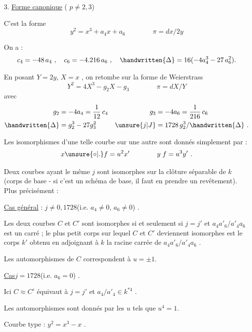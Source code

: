 
3. \uline{Forme canonique} ( $p\ne 2,3$)

C'est la forme
\[
 y^{2}=x^{3}+a_{4}x+a_{6}\qquad\qquad \pi=dx/2y
\]

On a :
\[
 c_{4}=-48\,a_{4}\ ,\quad c_{6}=-4\mathord{.}216\,a_{6}\ ,\quad
 \handwritten{\Delta}=16(-4a_{4}^{3}-27\,a_{6}^{2}).
\]

En posant $Y=2y$, $X=x$ , on retombe sur la forme de Weierstrass
\[
 Y^{2}=4X^{3}-g_{2}X-g_{3}\qquad\qquad \pi=dX/Y
\]
avec
\[
\begin{aligned}
g_{2}&=-4a_{4}=\frac{1}{12}\,c_{4} & g_{3}&=-4a_{6}=\frac{1}{216}\,c_{6}\\
\handwritten{\Delta}&=g_{2}^{3}-27g_{3}^{2} & \unsure{j|J}&=1728\,g_{2}^{3}/\handwritten{\Delta}\ .
\end{aligned}
\]

Les isomorphismes d'une telle courbe sur une autre sont donnés simplement par :
\[
 x\unsure{\circ|\mathord{.}}f=u^{2}x'\qquad\qquad y\;f=u^{3}y'\ .
\]

Deux courbes ayant le même $j$ sont isomorphes sur la clôture séparable de $k$ (corps de base - si c'est un schéma de base, il faut en prendre un revêtement). Plus précisément :

\uline{Cas général} : $j\ne 0,1728$\quad (i.e. $a_{4}\ne 0$, $a_{6}\ne 0$) .

Les deux courbes $C$ et $C'$ sont isomorphes si et seulement si $j=j'$ et $a_{4}a'_{6}/a'_{4}a_{6}$ est un carré ; le plus petit corps sur lequel $C$ et $C'$ deviennent isomorphes est le corps $k'$ obtenu en adjoignant à $k$ la racine carrée de $a_{4}a'_{6}/a'_{4}a_{6}$ .

Les automorphismes de $C$ correspondent à $u=\pm 1$.

\uline{Cas}\quad $j=1728$\quad (i.e. $a_{6}=0$) .

Ici $C\approx C'$ équivaut à $j=j'$ et $a_{4}/a'_{4}\in k^{\ast 4}$ .

Les automorphismes sont donnés par les $u$ tels que $u^{4}=1$.

Courbe type : $y^{2}=x^{3}-x$ .

